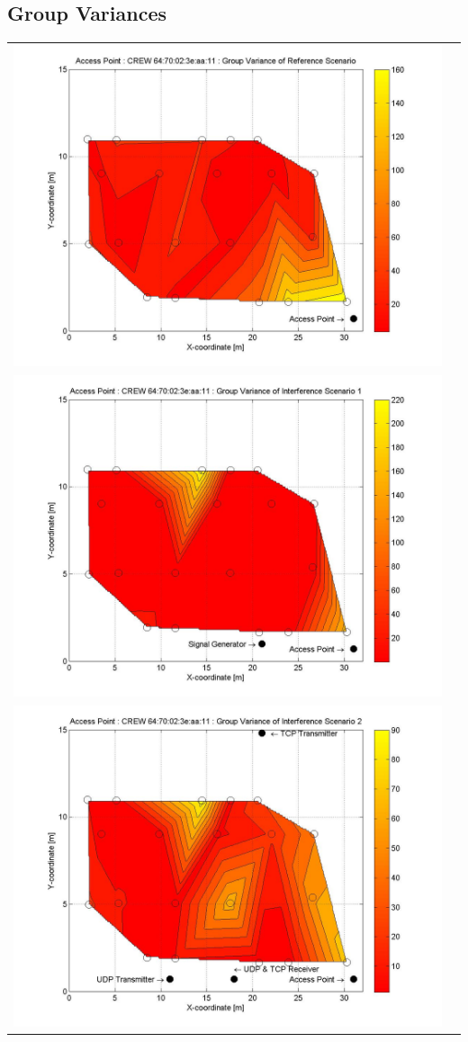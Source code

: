 \documentclass[11pt,a4paper,headinclude,footinclude,chapterprefix=on]{scrreprt}
\begin{document}
\subsection{Group Variances} 
\begin{longtable}
	{lr} 
	\includegraphics[width=13cm]{../../Source/plot/CREW_11/11_Ref_Group_Variance.jpg} \\
	\includegraphics[width=13cm]{../../Source/plot/CREW_11/11_Sig_Group_Variance.jpg} \\
	\includegraphics[width=13cm]{../../Source/plot/CREW_11/11_Wifi_Group_Variance.jpg} \\

\end{longtable}
\end{document}
